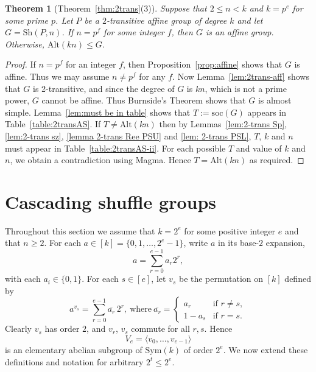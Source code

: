 \documentclass[12pt]{amsart}
\newtheorem{thm}{Theorem}[section]
\theoremstyle{remark}
\theoremstyle{definition}
\newcommand{\sym}{\mathrm{Sym}}
\newcommand{\alt}{\mathrm{Alt}}
\newcommand{\sh}{\mathrm{Sh}}
\begin{document}
\begin{thm}[Theorem~\ref{thm:2trans}(3)]
\label{thm:finish 2-trans}
Suppose that $2 \leqslant n < k$ and $k=p^e$ for some prime $p$. Let $P$ be a $2$-transitive affine group of degree $k$ and let $G=\sh(P,n)$. If $n=p^f$ for some integer $f$, then $G$ is an affine group. Otherwise,   $ \alt(kn) \leqslant G $.
\end{thm}
\begin{proof}
If $n=p^f$ for an integer $f$, then Proposition~\ref{prop:affine} shows that $G$ is affine. Thus we may assume $n\neq p^f$ for any $f$. Now Lemma~\ref{lem:2trans-aff} shows that $G$ is 2-transitive, and since the degree of $G$ is $kn$, which is not a prime power, $G$ cannot be affine. Thus Burnside's Theorem \cite[Theorem 4.3]{cameronpermgroups} shows that $G$ is almost simple. Lemma~\ref{lem:must be in table} shows that   $T:=\mathrm{soc}(G)$ appears in Table~\ref{table:2transAS}. If $T \neq \alt(kn)$ then by Lemmas~\ref{lem:2-trans Sp}, \ref{lem:2-trans sz}, \ref{lemma 2-trans Ree PSU} and \ref{lem: 2-trans PSL}, $T$, $k$ and $n$ must appear in Table~\ref{table:2transAS-ii}. For each possible $T$ and value of $k$ and $n$, we obtain a contradiction using {\sc Magma}. Hence $T=\alt(kn)$ as required.
\end{proof}
















\section{Cascading shuffle groups}
\label{sec:cascading}

Throughout this section we assume that $k = 2^e$ for some positive integer $e$ and that $n \geqslant 2$.
%
For each $a \in [k] = \{0, 1, \ldots, 2^e-1\}$, write $a$ in its base-$2$ expansion,
	\[ 
	a = \sum_{r=0}^{e-1} a_r 2^{r}, 
	\]
with each $a_i\in\{0,1\}$. For each $s \in [e]$, let $v_s$ be the permutation on $[k]$ defined by
	\begin{equation} \label{eq:v-action}
	a^{v_s} = \sum_{r=0}^{e-1} \overline{a_r}\, 2^{r}, \ \text{where} \ 
	\overline{a_r} = 
	\begin{cases} a_r &\text{if } r \neq s, \\ 1-a_s &\text{if } r = s. \end{cases}
	\end{equation}
Clearly $v_s$ has order $2$, and $v_r$, $v_s$ commute for all $r,s$. Hence 
	\begin{equation} \label{eq:V}
	V_{e} = \langle v_0, \ldots, v_{e-1} \rangle
	\end{equation}
is an elementary abelian subgroup of $\sym(k)$ of order $2^e$. We now extend these definitions and notation for arbitrary $2^t\leqslant 2^e$.
\end{document}
